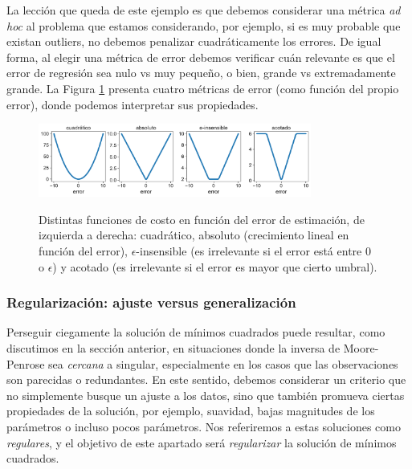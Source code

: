 La lección que queda de este ejemplo es que debemos considerar una métrica \emph{ad hoc} al problema que estamos considerando, por ejemplo, si es muy probable que existan outliers, no debemos penalizar cuadráticamente los errores. De igual forma, al elegir una métrica de error debemos verificar cuán relevante es que el error de regresión sea nulo vs muy pequeño, o bien,  grande vs extremadamente grande. La Figura \ref{fig:reg_lin_err} presenta cuatro métricas de error (como función del propio error), donde podemos interpretar sus propiedades. 

\begin{figure}[H]
	\centering
	\includegraphics[width=0.8\textwidth]{img/cap2_errores.pdf}\\
	\caption{Distintas funciones de costo en función del error de estimación, de izquierda a derecha: cuadrático, absoluto (crecimiento lineal en función del error), $\epsilon$-insensible (es irrelevante si el error está entre 0 o  $\epsilon$) y acotado (es irrelevante si el error es mayor que cierto umbral).}
	\label{fig:reg_lin_err}  
\end{figure}


\subsubsection{Regularización: ajuste versus generalización}
\label{sub:min_cuad_reg}

Perseguir ciegamente la solución de mínimos cuadrados puede resultar, como discutimos en la sección anterior, en situaciones donde la inversa de Moore-Penrose sea \emph{cercana} a singular, especialmente en los casos que las observaciones son parecidas o redundantes. En este sentido, debemos considerar un criterio que no simplemente busque un ajuste a los datos, sino que también promueva ciertas propiedades de la solución, por ejemplo, suavidad, bajas magnitudes de los parámetros o incluso pocos parámetros. Nos referiremos a estas soluciones como \emph{regulares}, y el objetivo de este apartado será \emph{regularizar} la solución de mínimos cuadrados.\\

